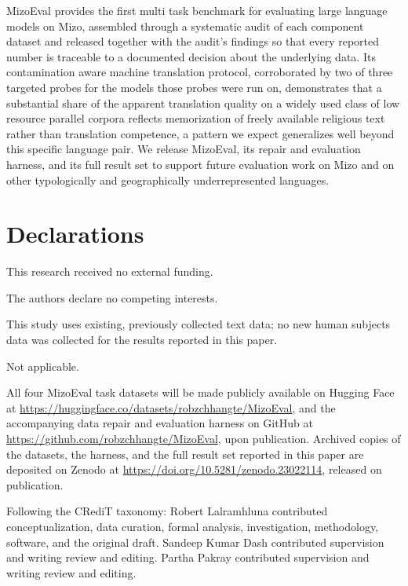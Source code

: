 \documentclass[pdflatex,sn-mathphys-ay]{sn-jnl}
\begin{document}
MizoEval provides the first multi task benchmark for evaluating large language models on Mizo, assembled through a systematic audit of each component dataset and released together with the audit's findings so that every reported number is traceable to a documented decision about the underlying data. Its contamination aware machine translation protocol, corroborated by two of three targeted probes for the models those probes were run on, demonstrates that a substantial share of the apparent translation quality on a widely used class of low resource parallel corpora reflects memorization of freely available religious text rather than translation competence, a pattern we expect generalizes well beyond this specific language pair. We release MizoEval, its repair and evaluation harness, and its full result set to support future evaluation work on Mizo and on other typologically and geographically underrepresented languages.

\backmatter

\section*{Declarations}

This research received no external funding.

The authors declare no competing interests.

This study uses existing, previously collected text data; no new human subjects data was collected for the results reported in this paper.

Not applicable.

All four MizoEval task datasets will be made publicly available on Hugging Face at \url{https://huggingface.co/datasets/robzchhangte/MizoEval}, and the accompanying data repair and evaluation harness on GitHub at \url{https://github.com/robzchhangte/MizoEval}, upon publication. Archived copies of the datasets, the harness, and the full result set reported in this paper are deposited on Zenodo at \url{https://doi.org/10.5281/zenodo.23022114}, released on publication.

Following the CRediT taxonomy: Robert Lalramhluna contributed conceptualization, data curation, formal analysis, investigation, methodology, software, and the original draft. Sandeep Kumar Dash contributed supervision and writing review and editing. Partha Pakray contributed supervision and writing review and editing.
\end{document}
